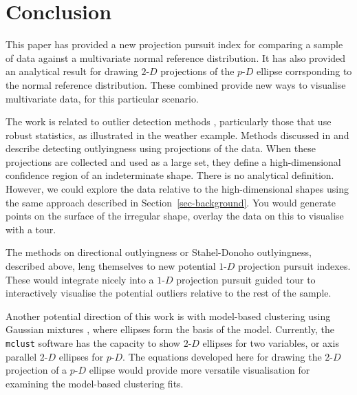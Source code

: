 \documentclass[
  12pt]{article}
\newcommand\pD{$p\text{-}D$}
\newcommand\gD{$2\text{-}D$}
\newcommand\bD{$1\text{-}D$}
\begin{document}
\section{Conclusion}\label{conclusion}

This paper has provided a new projection pursuit index for comparing a
sample of data against a multivariate normal reference distribution. It
has also provided an analytical result for drawing \gD{} projections of
the \pD{} ellipse corrsponding to the normal reference distribution.
These combined provide new ways to visualise multivariate data, for this
particular scenario.

The work is related to outlier detection methods \citep[see,][for
example]{filzmoser2018}, particularly those that use robust statistics,
as illustrated in the weather example. Methods discussed in
\citet{directional-outlyingness} and \citet{donoho1982} describe
detecting outlyingness using projections of the data. When these
projections are collected and used as a large set, they define a
high-dimensional confidence region of an indeterminate shape. There is
no analytical definition. However, we could explore the data relative to
the high-dimensional shapes using the same approach described in
Section~\ref{sec-background}. You would generate points on the surface
of the irregular shape, overlay the data on this to visualise with a
tour.

The methods on directional outlyingness or Stahel-Donoho outlyingness,
described above, leng themselves to new potential \bD{} projection
pursuit indexes. These would integrate nicely into a \bD{} projection
pursuit guided tour to interactively visualise the potential outliers
relative to the rest of the sample.

Another potential direction of this work is with model-based clustering
using Gaussian mixtures \citep{FR02}, where ellipses form the basis of
the model. Currently, the \texttt{mclust} software \citep{mclust} has
the capacity to show \gD{} ellipses for two variables, or axis parallel
\gD{} ellipses for \pD{}. The equations developed here for drawing the
\gD{} projection of a \pD{} ellipse would provide more versatile
visualisation for examining the model-based clustering fits.


  
\end{document}

